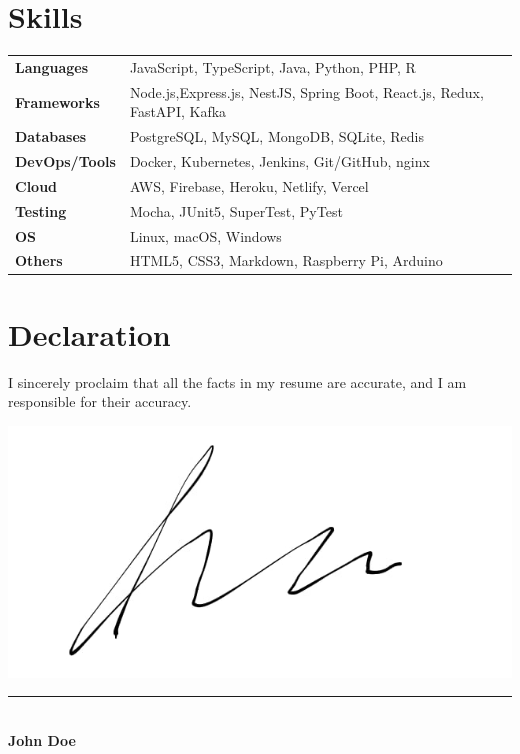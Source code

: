 \documentclass[letterpaper,10pt]{article}
\begin{document}
\section{Skills}
\begin{tabularx}{\textwidth}{@{} l X @{} }
\textbf{Languages} \hspace{1em} & JavaScript, TypeScript, Java, Python, PHP, R \\
\textbf{Frameworks} \hspace{1em} & Node.js,Express.js, NestJS, Spring Boot, React.js, Redux, FastAPI, Kafka \\
\textbf{Databases} \hspace{1em} & PostgreSQL, MySQL, MongoDB, SQLite, Redis \\
\textbf{DevOps/Tools} \hspace{1em} & Docker, Kubernetes, Jenkins, Git/GitHub, nginx \\
\textbf{Cloud} \hspace{1em} & AWS, Firebase, Heroku, Netlify, Vercel \\
\textbf{Testing} \hspace{1em} & Mocha, JUnit5, SuperTest, PyTest \\
\textbf{OS} \hspace{1em} & Linux, macOS, Windows \\
\textbf{Others} \hspace{1em} & HTML5, CSS3, Markdown, Raspberry Pi, Arduino \\
\end{tabularx}


\section{Declaration}
\vspace{-1pt}
\noindent
I sincerely proclaim that all the facts in my resume are accurate, and I am responsible for their accuracy.

\vspace{20pt}

\begin{flushleft}
  \includegraphics[scale=0.5]{sign.png} \\[4pt] %
  \vspace{10pt}
  \rule{5cm}{0.4pt} \\[-2pt]
  \textbf{John Doe}
\end{flushleft}


\end{document}
